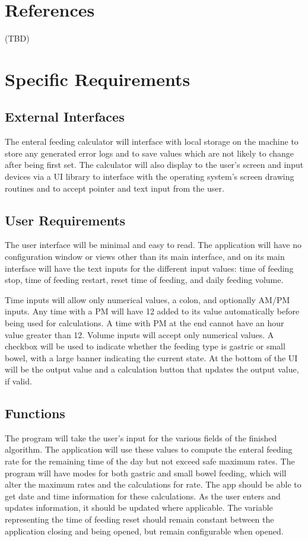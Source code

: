 \documentclass[fullpage,10pt, onecolumn, draftclsnofoot]{IEEEtran}
\begin{document}
\section{References}
(TBD)

\section{Specific Requirements}

\subsection{External Interfaces}
The enteral feeding calculator will interface with local storage on the machine to store any generated 
error logs and to save values which are not likely to change after being first set. The calculator will
also display to the user's screen and input devices via a UI library to interface with the operating system's screen drawing
routines and to accept pointer and text input from the user.

\subsection{User Requirements}
The user interface will be minimal and easy to read. The application will have no configuration window
or views other than its main interface, and on its main interface will have the text inputs for the different
input values: time of feeding stop, time of feeding restart, reset time of feeding, and daily feeding volume.

Time inputs will allow only numerical values, a colon, and optionally AM/PM inputs. Any time with a PM will
have 12 added to its value automatically before being used for calculations. A time with PM at the end cannot have an hour value greater than 12.
Volume inputs will accept only numerical values. A checkbox will be used to indicate whether the feeding type is gastric or
small bowel, with a large banner indicating the current state. At the bottom of the UI will be the output value and a calculation
button that updates the output value, if valid.

\subsection{Functions}
The program will take the user's input for the various fields of the finished algorithm.
The application will use these values to compute the enteral feeding rate for the remaining time of the day but not exceed safe maximum rates.
The program will have modes for both gastric and small bowel feeding, which will alter the maximum rates and the calculations for rate.
The app should be able to get date and time information for these calculations.
As the user enters and updates information, it should be updated where applicable.
The variable representing the time of feeding reset should remain constant between the application closing and being opened, but remain configurable when opened.
\end{document}
